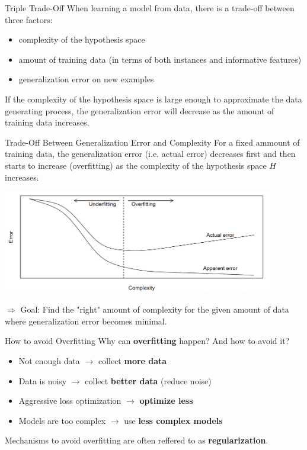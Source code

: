 \begin{frame}{Triple Trade-Off}
When learning a model from data, there is a trade-off between three factors:

\begin{itemize}
\item complexity of the hypothesis space 
\item amount of training data (in terms of both instances and informative features)
\item generalization error on new examples
\end{itemize}

\vfill

If the complexity of the hypothesis space is large enough to approximate the data generating process, the generalization error will decrease as the amount of training data increases. 
\end{frame}


\begin{frame}{Trade-Off Between Generalization Error and Complexity}
For a fixed ammount of training data, the generalization error (i.e. actual error) decreases first and then starts to increase (overfitting) as the complexity of the
hypothesis space \(H\) increases.

\scriptsize
\begin{center}
\includegraphics[width=0.9\textwidth]{plots/trade-off.png}
\end{center}

\normalsize  \vspace{-0.2cm} \(\Rightarrow\) 
Goal: Find the "right" amount of complexity for the given amount of data where generalization error becomes minimal.
\end{frame}


\begin{vbframe}{How to avoid Overfitting}
Why can \textbf{overfitting} happen? And how to avoid it?
\begin{itemize}
\def\labelenumi{\arabic{enumi}.}
\item Not enough data \(\to\) collect \textbf{more data}
\item Data is noisy \(\to\) collect \textbf{better data} (reduce noise) 
\item Aggressive loss optimization \(\to\) \textbf{optimize less}
\item Models are too complex \(\to\) use \textbf{less complex models}
\end{itemize}

Mechanisms to avoid overfitting are often reffered to as \textbf{regularization}.
\end{vbframe}



